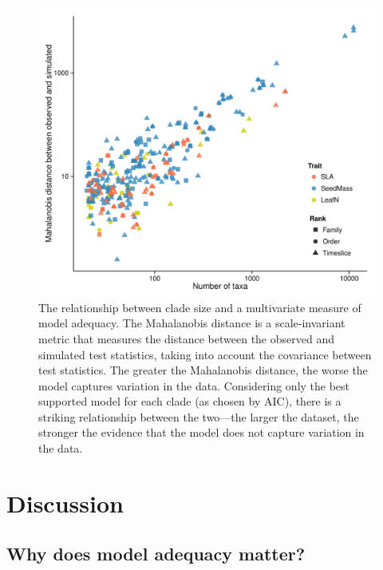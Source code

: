 \begin{figure}[p]
  \centering
  \includegraphics[width=\textwidth]{figs/ad-size-ml}
  \caption[Model adequacy vs. clade size (ML)]{The relationship between clade size and a multivariate measure of model adequacy. The Mahalanobis distance is a scale-invariant metric that measures the distance between the observed and simulated test statistics, taking into account the covariance between test statistics. The greater the Mahalanobis distance, the worse the model captures variation in the data. Considering only the best supported model for each clade (as chosen by AIC), there is a striking relationship between the two---the larger the dataset, the stronger the evidence that the model does not capture variation in the data.}
  \label{fig:size-adequacy}
\end{figure}

\section{Discussion}

\subsection{Why does model adequacy matter?}

